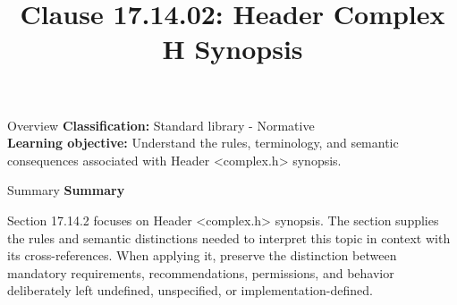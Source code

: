 \documentclass[10pt,letterpaper]{article}
\title{Clause 17.14.02: Header Complex H Synopsis}
\author{}
\date{}
\begin{document}
\maketitle
\begin{CornellOverviewBox}{Overview}
\textbf{Classification:} Standard library - Normative\\[2pt]
\textbf{Learning objective:} Understand the rules, terminology, and semantic consequences associated with Header <complex.h> synopsis.
\end{CornellOverviewBox}\begin{CornellSummaryBox}{Summary}
{\sffamily\bfseries\color{Accent} Summary}\par\vspace{3pt}Section 17.14.2 focuses on Header <complex.h> synopsis. The section supplies the rules and semantic distinctions needed to interpret this topic in context with its cross-references. When applying it, preserve the distinction between mandatory requirements, recommendations, permissions, and behavior deliberately left undefined, unspecified, or implementation-defined.
\end{CornellSummaryBox}
\end{document}
